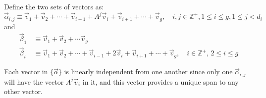 \documentclass[a4paper, reqno, 12pt]{amsart}
\begin{document}
		Define the two sets of vectors as:
		\[
			\vec{\alpha}_{i,j} \equiv \vec{v}_1 + \vec{v}_2 + \cdots + \vec{v}_{i-1} + A^{j}\vec{v}_i + \vec{v}_{i+1} + \cdots + \vec{v}_g, \quad
			i,j \in \mathds{Z}^+, 1 \leq i \leq g, 1 \leq j < d_i
		\]
		and
		\begin{align*}
			\vec{\beta}_1 \, &\equiv \vec{v}_1 + \vec{v}_2 + \cdots \vec{v}_g \\
			\vec{\beta}_i \, &\equiv \vec{v}_1 + \vec{v}_2 + \cdots + \vec{v}_{i-1} + 2\vec{v}_i + \vec{v}_{i+1} + \cdots + \vec{v}_g, \quad
			 i \in \mathds{Z}^+, \, 2 \leq i \leq g
		\end{align*}
		
		Each vector in $\{\vec{\alpha}\}$ is linearly independent from one another since only one $\vec{\alpha}_{i,j}$ will have the vector $A^{j}\vec{v}_i$ in it,
		and this vector provides a unique span to any other vector.
		
\end{document}

